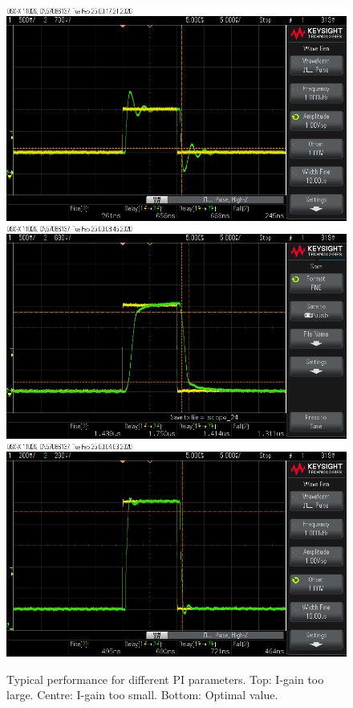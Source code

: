 \documentclass[twoside,a4paper]{refart}
\begin{document}
\begin{figure}[H]
	\includegraphics[width=\textwidth]{fig/I_high.png}\\
	\includegraphics[width=\textwidth]{fig/I_low.png}\\
	\includegraphics[width=\textwidth]{fig/I_opt.png}\\	
	\caption{Typical performance for different PI parameters. Top: I-gain too large. Centre: I-gain too small. Bottom: Optimal value.}
\end{figure}
\end{document}
